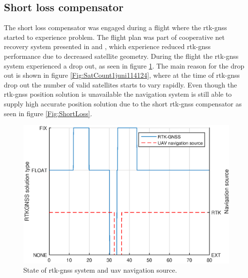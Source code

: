 \subsection{Short loss compensator}
The short loss compensator was engaged during a flight where the \gls{rtk-gnss} started to experience problem. The flight plan was part of cooperative net recovery system presented in \citep{Sigurd} and \citep{Jostein}, which experience reduced \gls{rtk-gnss} performance due to decreased satellite geometry. During the flight the \gls{rtk-gnss} system experienced a drop out, as seen in figure \ref{Fig:NavSource}. The main reason for the drop out is shown in figure \ref{Fig:SatCount1juni114124}, where at the time of \gls{rtk-gnss} drop out the number of valid satellites starts to vary rapidly. Even though the \gls{rtk-gnss} position solution is unavailable the navigation system is still able to supply high accurate position solution due to the short \gls{rtk-gnss} compensator as seen in figure \ref{Fig:ShortLoss}.
\begin{figure}[H]
\centering
\includegraphics[scale=0.7]{figs/Experiment/navSource.eps}
\caption{State of \gls{rtk-gnss} system and \gls{uav} navigation source.}
\label{Fig:NavSource}
\end{figure}
